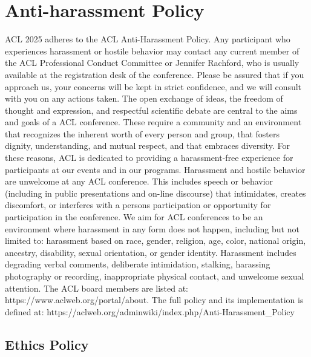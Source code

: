 \chapter{Anti-harassment Policy}
\vspace*{0.2cm}

ACL 2025 adheres to the ACL Anti-Harassment Policy. Any participant who experiences harassment or hostile behavior may contact any current member of the ACL Professional Conduct Committee or Jennifer Rachford, who is usually available at the registration desk of the conference. Please be assured that if you approach us, your concerns will be kept in strict confidence, and we will consult with you on any actions taken. The open exchange of ideas, the freedom of thought and expression, and respectful scientific debate are central to the aims and goals of a ACL conference. These require a community and an environment that recognizes the inherent worth of every person and group, that fosters dignity, understanding, and mutual respect, and that embraces diversity. For these reasons, ACL is dedicated to providing a harassment-free experience for participants at our events and in our programs. 
Harassment and hostile behavior are unwelcome at any ACL conference. This includes speech or behavior (including in public presentations and on-line discourse) that intimidates, creates discomfort, or interferes with a persons participation or opportunity for participation in the conference. We aim for ACL conferences to be an environment where harassment in any form does not happen, including but not limited to: harassment based on race, gender, religion, age, color, national origin, ancestry, disability, sexual orientation, or gender identity. 
Harassment includes degrading verbal comments, deliberate intimidation, stalking, harassing photography or recording, inappropriate physical contact, and unwelcome sexual attention. 
The ACL board members are listed at: 
https://www.aclweb.org/portal/about. 
The full policy and its implementation is defined at: 
https://aclweb.org/adminwiki/index.php/Anti-Harassment\_Policy


\section{Ethics Policy}
\vspace*{0.2cm}

